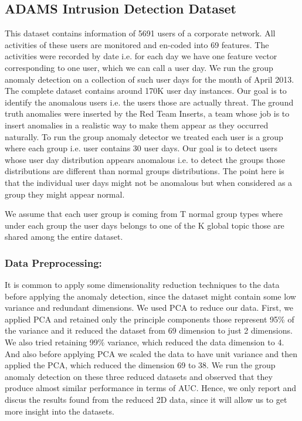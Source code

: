\documentclass[letterpaper]{article}
\begin{document}
\subsection{ADAMS Intrusion Detection Dataset}
This dataset contains information of 5691 users of a corporate network. All activities of these users are monitored and en-coded into 69 features. The activities were recorded by date i.e. for each day we have one feature vector corresponding to one user, which we can call a user day. We run the group anomaly detection on a collection of such user days for the month of April 2013. The complete dataset contains around 170K user day instances. Our goal is to identify the anomalous users i.e. the users those are actually threat. The ground truth anomalies were inserted by the Red Team Inserts, a team whose job is to insert anomalies in a realistic way to make them appear as they occurred naturally. To run the group anomaly detector we treated each user is a group where each group i.e. user contains 30 user days. Our goal is to detect users whose user day distribution appears anomalous i.e. to detect the groups those distributions are different than normal groups distributions. The point here is that the individual user days might not be anomalous but when considered as a group they might appear normal.

We assume that each user group is coming from T normal group types where under each group the user days belongs to one of the K global topic those are shared among the entire dataset.

\subsubsection{Data Preprocessing:}
It is common to apply some dimensionality reduction techniques to the data before applying the anomaly detection, since the dataset might contain some low variance and redundant dimensions. We used PCA to reduce our data. First, we applied PCA and retained only the principle components those represent 95\% of the variance and it reduced the dataset from 69 dimension to just 2 dimensions. We also tried retaining 99\% variance, which reduced the data dimension to 4. And also before applying PCA we scaled the data to have unit variance and then applied the PCA, which reduced the dimension 69 to 38. We run the group anomaly detection on these three reduced datasets and observed that they produce almost similar performance in terms of AUC. Hence, we only report and discus the results found from the reduced 2D data, since it will allow us to get more insight into the datasets.
\end{document}
